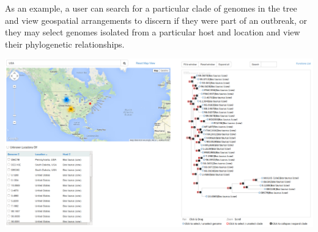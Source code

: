 \documentclass{bmcart}
\begin{document}
As an example, a user can search for a particular clade of genomes in the tree and view geospatial arrangements to discern if they were part of an outbreak, or they may select genomes isolated from a particular host and location and view their phylogenetic relationships.

\pagebreak
\begin{landscape}
\includegraphics[scale=0.33]{../manuscript_images/geophy.png}
\end{landscape}
\end{document}
